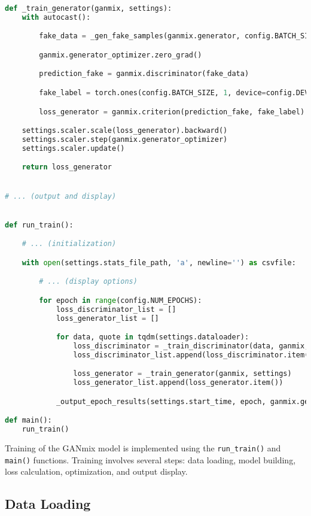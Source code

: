\begin{lstlisting}[language=Python, caption={Implementation of the training loop for the GANmix.}]
def _train_generator(ganmix, settings):
    with autocast():

        fake_data = _gen_fake_samples(ganmix.generator, config.BATCH_SIZE)

        ganmix.generator_optimizer.zero_grad()

        prediction_fake = ganmix.discriminator(fake_data)

        fake_label = torch.ones(config.BATCH_SIZE, 1, device=config.DEVICE)

        loss_generator = ganmix.criterion(prediction_fake, fake_label)

    settings.scaler.scale(loss_generator).backward()
    settings.scaler.step(ganmix.generator_optimizer)
    settings.scaler.update()

    return loss_generator


# ... (output and display)


def run_train():

    # ... (initialization)

    with open(settings.stats_file_path, 'a', newline='') as csvfile:

        # ... (display options)

        for epoch in range(config.NUM_EPOCHS):
            loss_discriminator_list = []
            loss_generator_list = []

            for data, quote in tqdm(settings.dataloader):
                loss_discriminator = _train_discriminator(data, ganmix, settings)
                loss_discriminator_list.append(loss_discriminator.item())

                loss_generator = _train_generator(ganmix, settings)
                loss_generator_list.append(loss_generator.item())

            _output_epoch_results(settings.start_time, epoch, ganmix.generator, ganmix.vae, loss_discriminator_list, loss_generator_list, csv_writer, csvfile)

def main():
    run_train()
\end{lstlisting}

Training of the GANmix model is implemented using the \texttt{run\_train()} and \texttt{main()} functions. Training involves several steps: data loading, model building, loss calculation, optimization, and output display.

\subsection{Data Loading}

